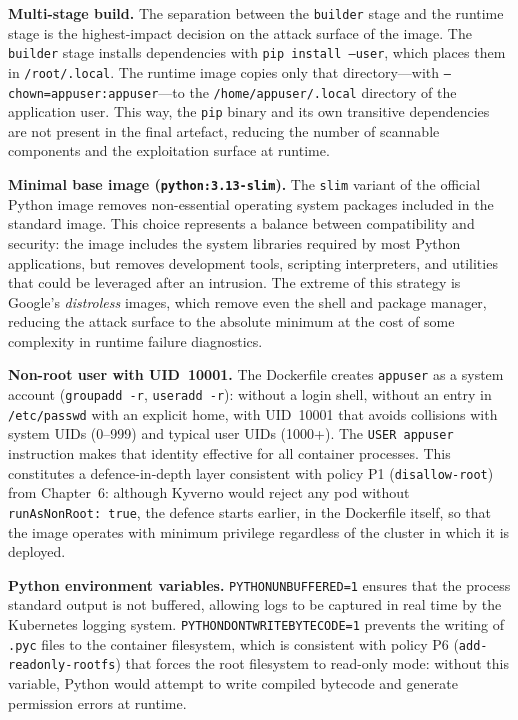 \textbf{Multi-stage build.} The separation between the \texttt{builder} stage and the runtime stage is the highest-impact decision on the attack surface of the image. The \texttt{builder} stage installs dependencies with \texttt{pip install --user}, which places them in \texttt{/root/.local}. The runtime image copies only that directory---with \texttt{--chown=appuser:appuser}---to the \texttt{/home/appuser/.local} directory of the application user. This way, the \texttt{pip} binary and its own transitive dependencies are not present in the final artefact, reducing the number of scannable components and the exploitation surface at runtime.

\textbf{Minimal base image (\texttt{python:3.13-slim}).} The \texttt{slim} variant of the official Python image removes non-essential operating system packages included in the standard image. This choice represents a balance between compatibility and security: the image includes the system libraries required by most Python applications, but removes development tools, scripting interpreters, and utilities that could be leveraged after an intrusion. The extreme of this strategy is Google's \textit{distroless} \cite{distroless_docs} images, which remove even the shell and package manager, reducing the attack surface to the absolute minimum at the cost of some complexity in runtime failure diagnostics.

\textbf{Non-root user with UID~10001.} The Dockerfile creates \texttt{appuser} as a system account (\texttt{groupadd -r}, \texttt{useradd -r}): without a login shell, without an entry in \texttt{/etc/passwd} with an explicit home, with UID~10001 that avoids collisions with system UIDs (0--999) and typical user UIDs (1000+). The \texttt{USER appuser} instruction makes that identity effective for all container processes. This constitutes a defence-in-depth layer consistent with policy P1 (\texttt{disallow-root}) from Chapter~6: although Kyverno would reject any pod without \texttt{runAsNonRoot:\,true}, the defence starts earlier, in the Dockerfile itself, so that the image operates with minimum privilege regardless of the cluster in which it is deployed.

\textbf{Python environment variables.} \texttt{PYTHONUNBUFFERED=1} ensures that the process standard output is not buffered, allowing logs to be captured in real time by the Kubernetes logging system. \texttt{PYTHONDONTWRITEBYTECODE=1} prevents the writing of \texttt{.pyc} files to the container filesystem, which is consistent with policy P6 (\texttt{add-readonly-rootfs}) that forces the root filesystem to read-only mode: without this variable, Python would attempt to write compiled bytecode and generate permission errors at runtime.

